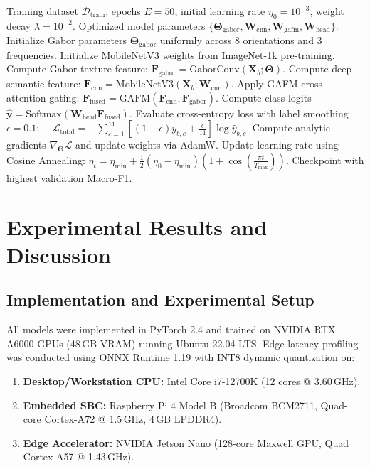 \documentclass[journal]{IEEEtran}
\begin{document}
\begin{algorithm}[t]
\caption{LitchiHybridNet Dual-Branch Training Pipeline}
\label{alg:training}
\begin{algorithmic}[1]
\REQUIRE Training dataset $\mathcal{D}_{\text{train}}$, epochs $E = 50$, initial learning rate $\eta_0 = 10^{-3}$, weight decay $\lambda = 10^{-2}$.
\ENSURE Optimized model parameters $\{\mathbf{\Theta}_{\text{gabor}}, \mathbf{W}_{\text{cnn}}, \mathbf{W}_{\text{gafm}}, \mathbf{W}_{\text{head}}\}$.
\STATE Initialize Gabor parameters $\mathbf{\Theta}_{\text{gabor}}$ uniformly across 8 orientations and 3 frequencies.
\STATE Initialize MobileNetV3 weights from ImageNet-1k pre-training.
        \STATE Compute Gabor texture feature: $\mathbf{F}_{\text{gabor}} = \text{GaborConv}(\mathbf{X}_b; \mathbf{\Theta})$.
        \STATE Compute deep semantic feature: $\mathbf{F}_{\text{cnn}} = \text{MobileNetV3}(\mathbf{X}_b; \mathbf{W}_{\text{cnn}})$.
        \STATE Apply GAFM cross-attention gating: $\mathbf{F}_{\text{fused}} = \text{GAFM}(\mathbf{F}_{\text{cnn}}, \mathbf{F}_{\text{gabor}})$.
        \STATE Compute class logits $\hat{\mathbf{y}} = \text{Softmax}(\mathbf{W}_{\text{head}} \mathbf{F}_{\text{fused}})$.
        \STATE Evaluate cross-entropy loss with label smoothing $\epsilon = 0.1$:
        \STATE $\quad \mathcal{L}_{\text{total}} = -\sum_{c=1}^{11} \left[(1-\epsilon)y_{b,c} + \frac{\epsilon}{11}\right] \log \hat{y}_{b,c}$.
        \STATE Compute analytic gradients $\nabla_{\mathbf{\Theta}} \mathcal{L}$ and update weights via AdamW.
        \STATE Update learning rate using Cosine Annealing: $\eta_t = \eta_{\min} + \frac{1}{2}(\eta_0 - \eta_{\min})(1 + \cos(\frac{\pi t}{T_{\max}}))$.
    \ENDFOR
\ENDFOR
\RETURN Checkpoint with highest validation Macro-F1.
\end{algorithmic}
\end{algorithm}

\section{Experimental Results and Discussion}

\subsection{Implementation and Experimental Setup}
All models were implemented in PyTorch 2.4 and trained on NVIDIA RTX A6000 GPUs (48\,GB VRAM) running Ubuntu 22.04 LTS. Edge latency profiling was conducted using ONNX Runtime 1.19 with INT8 dynamic quantization on:
\begin{enumerate}
    \item \textbf{Desktop/Workstation CPU:} Intel Core i7-12700K (12 cores @ 3.60\,GHz).
    \item \textbf{Embedded SBC:} Raspberry Pi 4 Model B (Broadcom BCM2711, Quad-core Cortex-A72 @ 1.5\,GHz, 4\,GB LPDDR4).
    \item \textbf{Edge Accelerator:} NVIDIA Jetson Nano (128-core Maxwell GPU, Quad Cortex-A57 @ 1.43\,GHz).
\end{enumerate}
\end{document}
